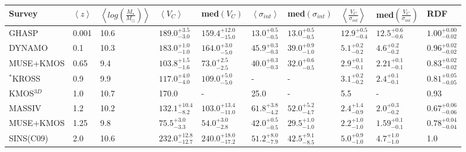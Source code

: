 \documentclass[fleqn,usenatbib]{mnras}
\newcommand{\cmark}{\ding{51}}%
\newcommand{\xmark}{\ding{55}}%
\begin{document}
\begin{table*}
\begin{threeparttable}
\begin{tabular}{llllllllll}
 \hline
Survey & $\left< z \right> $ & $\left< log\left(\frac{M_{\star}}{M_{\odot}}\right)\right>$ & $\left<V_{C}\right>$ & med$\left(V_{C}\right)$ & $ \left< \sigma_{int} \right>$ & med$\left(\sigma_{int}\right)$ & $\left< \frac{V_{C}}{\sigma_{int}} \right>$ & med$\left(\frac{V_{C}}{\sigma_{int}}\right)$ & RDF  \\[1ex]
 \hline
 GHASP & 0.001 & 10.6   &       $189.0^{+3.5}_{-3.0}$ \cmark  & $159.4^{+12.0}_{-15.0}$ &  $13.0^{+0.5}_{-0.5}$ \cmark & $13.0^{+0.5}_{-0.5}$ & $12.9^{+0.5}_{-0.4}$ \cmark &           $12.5^{+0.6}_{-0.6}$&               $1.00^{+0.00}_{-0.02}$  \cmark   \\[1ex]
 DYNAMO & 0.1 & 10.3    &       $183.0^{+1.0}_{-1.0}$ \xmark  & $164.0^{+3.0}_{-5.0}$   &  $45.9^{+0.3}_{-0.3}$ \xmark & $39.0^{+0.9}_{-1.0}$ & $5.1^{+0.2}_{-0.2}$  \xmark &           $4.6^{+0.2}_{-0.2}$ &               $0.96^{+0.02}_{-0.02}$  \xmark   \\[1ex]
 MUSE+KMOS & 0.65 & 9.4 &       $103.8^{+1.5}_{-1.6}$ \cmark  & $73.0^{+2.5}_{-2.5}$    &  $40.0^{+0.3}_{-0.3}$ \cmark & $32.0^{+0.6}_{-0.5}$ & $2.9^{+0.1}_{-0.1}$  \cmark &           $2.21^{+0.1}_{-0.1}$&               $0.83^{+0.02}_{-0.02}$  \cmark   \\[1ex]
 $^{*}$KROSS & 0.9 & 9.9 &      $117.0^{+4.0}_{-4.0}$ \cmark  & $109.0^{+5.0}_{-5.0}$   &  -                    \cmark & -                    & $3.1^{+0.2}_{-0.2}$  \cmark &           $2.4^{+0.1}_{-0.1}$ &               $0.81^{+0.05}_{-0.05}$  \cmark   \\[1ex]
 KMOS$^{3D}$ & 1.0 & 10.7  &     170.0                        &  -                      &  25.0                 \xmark &  -                   & 5.5                  \xmark &            -                  &               0.93                    \xmark   \\[1ex]
 MASSIV & 1.2 & 10.2 &          $132.1^{+10.4}_{-8.2}$ \cmark & $103.0^{+13.4}_{-11.0}$ &  $61.8^{+3.8}_{-4.2}$ \cmark & $52.0^{+5.2}_{-4.7}$ & $2.4^{+1.4}_{-0.9}$  \cmark &           $2.0^{+0.3}_{-0.2}$ &               $0.67^{+0.06}_{-0.06}$  \cmark   \\[1ex]
 MUSE+KMOS & 1.25 & 9.8 &       $75.5^{+3.0}_{-3.3}$   \cmark & $54.0^{+3.0}_{-2.8}$    &  $42.0^{+0.5}_{-0.5}$ \cmark & $29.5^{+1.0}_{-1.0}$ & $2.2^{+1.0}_{-1.0}$  \cmark &           $1.59^{+0.1}_{-0.1}$&               $0.78^{+0.04}_{-0.04}$  \cmark   \\[1ex]
 SINS(C09) & 2.0 & 10.6 &       $232.0^{+12.8}_{-12.7}$\cmark & $240.0^{+18.0}_{-17.2}$ &  $51.2^{+8.0}_{-7.9}$ \cmark & $42.5^{+9.1}_{-8.5}$ & $5.0^{+0.9}_{-1.0}$  \xmark &           $4.7^{+1.0}_{-1.0}$ &               1.0                     \cmark   \\[1ex]

\end{tabular}
\end{threeparttable}
\end{table*}
\end{document}
